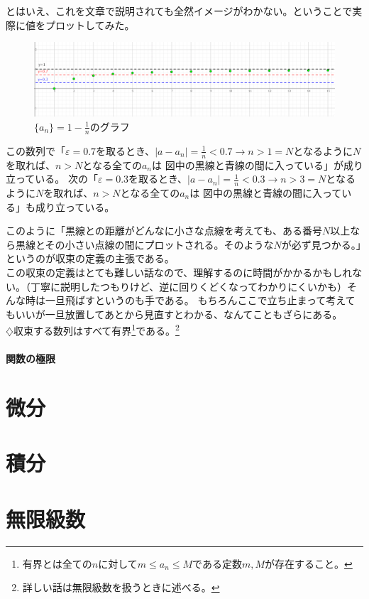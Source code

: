 \documentclass[a4j,dvipdfmx]{jsarticle}
\begin{document}
                とはいえ、これを文章で説明されても全然イメージがわかない。ということで実際に値をプロットしてみた。
                \begin{figure}[h]
                    \centering
                    \includegraphics[keepaspectratio,scale=0.45]{img/QuuNote/SequeanceLimitGraph.png}
                    \caption{$\{a_n\}=1-\frac{1}{n}$のグラフ}
                \end{figure}
                
                この数列で「$\varepsilon=0.7$を取るとき、$|a-a_n|=\frac{1}{n}<0.7\to n> 1=N$となるように$N$を取れば、$n>N$となる全ての$a_n$は
                図中の黒線と青線の間に入っている」が成り立っている。
                次の「$\varepsilon=0.3$を取るとき、$|a-a_n|=\frac{1}{n}<0.3\to n>3=N$となるように$N$を取れば、$n>N$となる全ての$a_n$は
                図中の黒線と青線の間に入っている」も成り立っている。

                このように「黒線との距離がどんなに小さな点線を考えても、ある番号$N$以上なら黒線とその小さい点線の間にプロットされる。そのような$N$が必ず見つかる。」というのが収束の定義の主張である。\\

                この収束の定義はとても難しい話なので、理解するのに時間がかかるかもしれない。（丁寧に説明したつもりけど、逆に回りくどくなってわかりにくいかも）そんな時は一旦飛ばすというのも手である。
                もちろんここで立ち止まって考えてもいいが一旦放置してあとから見直すとわかる、なんてこともざらにある。\\

                {\color{blue}$\diamondsuit$収束する数列はすべて有界\footnote{有界とは全ての$n$に対して$m\leq a_n \leq M$である定数$m,M$が存在すること。}である。\footnote{詳しい話は無限級数を扱うときに述べる。}}
            \clearpage
            \subsection{関数の極限}
    \clearpage
    \part{微分}

    \clearpage
    \part{積分}

    \clearpage
    \part{無限級数}
\end{document}

